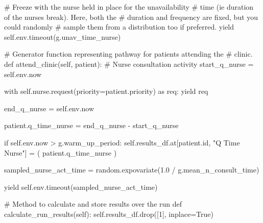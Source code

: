 \documentclass[
  letterpaper,
  DIV=11,
  numbers=noendperiod]{scrreprt}
\newenvironment{Shaded}{}{}
\newcommand{\BuiltInTok}[1]{\textcolor[rgb]{0.84,0.23,0.29}{#1}}
\newcommand{\CommentTok}[1]{\textcolor[rgb]{0.42,0.45,0.49}{#1}}
\newcommand{\ControlFlowTok}[1]{\textcolor[rgb]{0.84,0.23,0.29}{#1}}
\newcommand{\DecValTok}[1]{\textcolor[rgb]{0.00,0.36,0.77}{#1}}
\newcommand{\FloatTok}[1]{\textcolor[rgb]{0.00,0.36,0.77}{#1}}
\newcommand{\ImportTok}[1]{\textcolor[rgb]{0.01,0.18,0.38}{#1}}
\newcommand{\KeywordTok}[1]{\textcolor[rgb]{0.84,0.23,0.29}{#1}}
\newcommand{\NormalTok}[1]{\textcolor[rgb]{0.14,0.16,0.18}{#1}}
\newcommand{\OperatorTok}[1]{\textcolor[rgb]{0.14,0.16,0.18}{#1}}
\newcommand{\StringTok}[1]{\textcolor[rgb]{0.01,0.18,0.38}{#1}}
\newcommand{\VariableTok}[1]{\textcolor[rgb]{0.89,0.38,0.04}{#1}}
\begin{document}
\begin{tcolorbox}
\begin{Shaded}
\begin{Highlighting}[]
                \CommentTok{\# Freeze with the nurse held in place for the unavailability}
                \CommentTok{\# time (ie duration of the nurse\textquotesingle{}s break).  Here, both the}
                \CommentTok{\# duration and frequency are fixed, but you could randomly}
                \CommentTok{\# sample them from a distribution too if preferred.}
                \ControlFlowTok{yield} \VariableTok{self}\NormalTok{.env.timeout(g.unav\_time\_nurse)}

    \CommentTok{\# Generator function representing pathway for patients attending the}
    \CommentTok{\# clinic.}
    \KeywordTok{def}\NormalTok{ attend\_clinic(}\VariableTok{self}\NormalTok{, patient):}
        \CommentTok{\# Nurse consultation activity}
\NormalTok{        start\_q\_nurse }\OperatorTok{=} \VariableTok{self}\NormalTok{.env.now}

        \ControlFlowTok{with} \VariableTok{self}\NormalTok{.nurse.request(priority}\OperatorTok{=}\NormalTok{patient.priority) }\ImportTok{as}\NormalTok{ req:}
            \ControlFlowTok{yield}\NormalTok{ req}

\NormalTok{            end\_q\_nurse }\OperatorTok{=} \VariableTok{self}\NormalTok{.env.now}

\NormalTok{            patient.q\_time\_nurse }\OperatorTok{=}\NormalTok{ end\_q\_nurse }\OperatorTok{{-}}\NormalTok{ start\_q\_nurse}

            \ControlFlowTok{if} \VariableTok{self}\NormalTok{.env.now }\OperatorTok{\textgreater{}}\NormalTok{ g.warm\_up\_period:}
                \VariableTok{self}\NormalTok{.results\_df.at[patient.}\BuiltInTok{id}\NormalTok{, }\StringTok{"Q Time Nurse"}\NormalTok{] }\OperatorTok{=}\NormalTok{ (}
\NormalTok{                    patient.q\_time\_nurse}
\NormalTok{                )}

\NormalTok{            sampled\_nurse\_act\_time }\OperatorTok{=}\NormalTok{ random.expovariate(}\FloatTok{1.0} \OperatorTok{/}
\NormalTok{                                                        g.mean\_n\_consult\_time)}

            \ControlFlowTok{yield} \VariableTok{self}\NormalTok{.env.timeout(sampled\_nurse\_act\_time)}

    \CommentTok{\# Method to calculate and store results over the run}
    \KeywordTok{def}\NormalTok{ calculate\_run\_results(}\VariableTok{self}\NormalTok{):}
        \VariableTok{self}\NormalTok{.results\_df.drop([}\DecValTok{1}\NormalTok{], inplace}\OperatorTok{=}\VariableTok{True}\NormalTok{)}


\end{Highlighting}
\end{Shaded}
\end{tcolorbox}
\end{document}
